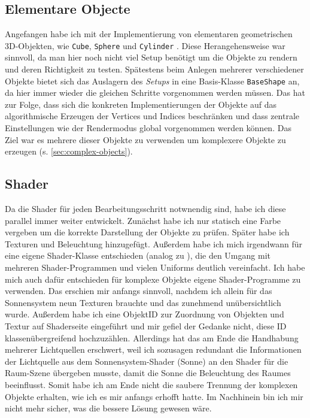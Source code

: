 \documentclass{article}
\let\oldsubsection\subsection
\renewcommand\subsection{\needspace{5\baselineskip}\oldsubsection}
\begin{document}
\subsection{Elementare Objecte} \label{sec:elementary-objects}
Angefangen habe ich mit der Implementierung von elementaren geometrischen 3D-Objekten, wie \texttt{Cube}, \texttt{Sphere} \cite{sphere} und \texttt{Cylinder} \cite{cylinder}.
Diese Herangehensweise war sinnvoll, da man hier noch nicht viel Setup benötigt um die Objekte zu rendern und deren Richtigkeit zu testen.
Spätestens beim Anlegen mehrerer verschiedener Objekte bietet sich das Auslagern des \textit{Setups} in eine Basis-Klasse \texttt{BaseShape} an, da hier immer wieder die gleichen Schritte vorgenommen werden müssen.
Das hat zur Folge, dass sich die konkreten Implementierungen der Objekte auf das algorithmische Erzeugen der Vertices und Indices beschränken und dass zentrale Einstellungen wie der Rendermodus global vorgenommen werden können.
Das Ziel war es mehrere dieser Objekte zu verwenden um komplexere Objekte zu erzeugen (s. \ref{sec:complex-objects}).

\subsection{Shader}
Da die Shader für jeden Bearbeitungsschritt notwnendig sind, habe ich diese parallel immer weiter entwickelt. 
Zunächst habe ich nur statisch eine Farbe vergeben um die korrekte Darstellung der Objekte zu prüfen.
Später habe ich Texturen und Beleuchtung hinzugefügt.
Außerdem habe ich mich irgendwann für eine eigene Shader-Klasse entschieden (analog zu \cite{shader-class}), die den Umgang mit mehreren Shader-Programmen und vielen Uniforms deutlich vereinfacht.
Ich habe mich auch dafür entschieden für komplexe Objekte eigene Shader-Programme zu verwenden.
Das erschien mir anfangs sinnvoll, nachdem ich allein für das Sonnensystem neun Texturen brauchte und das zunehmend unübersichtlich wurde. 
Außerdem habe ich eine ObjektID zur Zuordnung von Objekten und Textur auf Shaderseite eingeführt und mir gefiel der Gedanke nicht, diese ID klassenübergreifend hochzuzählen.
Allerdings hat das am Ende die Handhabung mehrerer Lichtquellen erschwert, weil ich sozusagen redundant die Informationen der Lichtquelle aus dem Sonnensystem-Shader (Sonne) an den Shader für die Raum-Szene übergeben musste, damit die Sonne die Beleuchtung des Raumes beeinflusst.
Somit habe ich am Ende nicht die saubere Trennung der komplexen Objekte erhalten, wie ich es mir anfangs erhofft hatte.
Im Nachhinein bin ich mir nicht mehr sicher, was die bessere Lösung gewesen wäre. 
\end{document}
